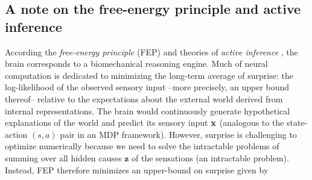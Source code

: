 \documentclass[10pt,letterpaper]{article}
\def\z{\mathbf{z}}
\def\x{\mathbf{x}}
\begin{document}
\subsection{A note on the free-energy principle and active inference}
According the \textit{free-energy principle} (FEP) and theories of
\textit{active inference} \citep{friston2010free, fristonAIorRL,dayan1995helmholtz},
the brain corresponds to
a biomechanical reasoning engine. Much of neural computation is
dedicated to minimizing the long-term average of surprise: the log-likelihood of the observed sensory input --more precisely, an upper bound thereof-- relative to the expectations about the external world derived from internal representations. The brain
would continuously generate hypothetical explanations of the world
and predict its sensory input $\bf{x}$ (analogous to the state-action $(s, a)$ pair in an MDP
framework).
However, surprise is challenging to optimize numerically
because we need to solve the intractable problems of
summing over all hidden causes $\z$ of the sensations (an intractable problem).
Instead, FEP therefore minimizes an upper-bound on surprise given by
\end{document}
